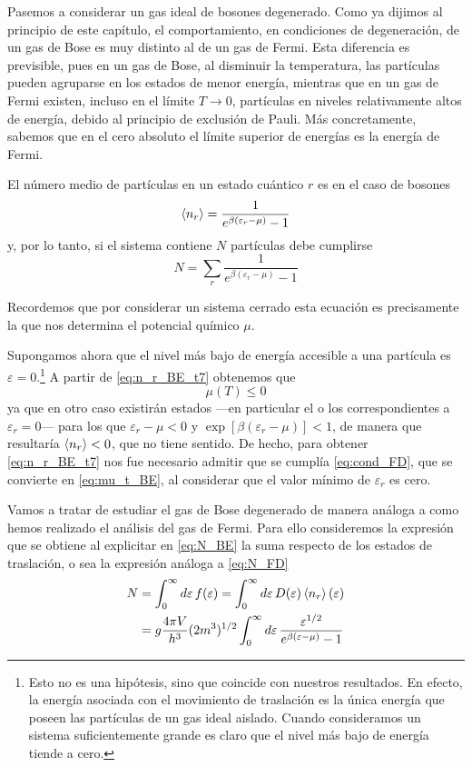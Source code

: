 Pasemos a considerar un gas ideal de bosones degenerado.
Como ya dijimos al principio de este capítulo, el comportamiento, en condiciones de degeneración, de un gas de Bose es muy distinto al de un gas de Fermi.
Esta diferencia es previsible, pues en un gas de Bose, al disminuir la temperatura, las partículas pueden agruparse en los estados de menor energía, mientras que en un gas de Fermi existen, incluso en el límite $T \rightarrow 0$, partículas en niveles relativamente altos de energía, debido al principio de exclusión de Pauli.
Más concretamente, sabemos que en el cero absoluto el límite superior de energías es la energía de Fermi.

El número medio de partículas en un estado cuántico $r$ es en el caso de bosones
\begin{equation}\label{eq:n_r_BE_t7}
	\expval{n_r} = \frac{1}{e^{\beta(\varepsilon_r -\mu)} - 1}
\end{equation}
y, por lo tanto, si el sistema contiene $N$ partículas debe cumplirse
\begin{equation}\label{eq:N_BE}
	N = \sum_r \frac{1}{e^{\beta(\varepsilon_r -\mu)} - 1}
\end{equation}

Recordemos que por considerar un sistema cerrado esta ecuación es precisamente la que nos determina el potencial químico $\mu$.

Supongamos ahora que el nivel más bajo de energía accesible a una partícula es $\varepsilon = 0$.\footnote{Esto no es una hipótesis, sino que coincide con nuestros resultados. En efecto, la energía asociada con el movimiento de traslación es la única energía que poseen las partículas de un gas ideal aislado. Cuando consideramos un sistema suficientemente grande es claro que el nivel más bajo de energía tiende a cero.}
A partir de \eqref{eq:n_r_BE_t7} obtenemos que
\begin{equation}\label{eq:mu_t_BE}
	\mu(T) \leq 0
\end{equation}
ya que en otro caso existirán estados ---en particular el o los correspondientes a $\varepsilon_r = 0$--- para los que $\varepsilon_r -\mu < 0$ y $\exp[\beta(\varepsilon_r -\mu)] < 1$, de manera que resultaría $\expval{n_r} < 0$, que no tiene sentido.
De hecho, para obtener \eqref{eq:n_r_BE_t7} nos fue necesario admitir que se cumplía \eqref{eq:cond_FD}, que se convierte en \eqref{eq:mu_t_BE}, al considerar que el valor mínimo de $\varepsilon_r$ es cero.

Vamos a tratar de estudiar el gas de Bose degenerado de manera análoga a como hemos realizado el análisis del gas de Fermi.
Para ello consideremos la expresión que se obtiene al explicitar en \eqref{eq:N_BE} la suma respecto de los estados de traslación, o sea la expresión análoga a \eqref{eq:N_FD}
\begin{align}\label{eq:N_2_BE}
	N &= \int_0^{\infty} \dd{\varepsilon} f(\varepsilon) = \int_0^{\infty} \dd{\varepsilon} D(\varepsilon) \expval{n_r}(\varepsilon) \nonumber \\
	&= g \frac{4\pi V}{h^3} (2m^3)^{1/2} \int_0^{\infty} \dd{\varepsilon} \frac{\varepsilon^{1/2}}{e^{\beta(\varepsilon -\mu)} - 1}
\end{align}

